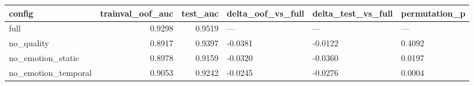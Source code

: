 \begin{tabular}{lrrlll}
\toprule
config & trainval_oof_auc & test_auc & delta_oof_vs_full & delta_test_vs_full & permutation_p \\
\midrule
full & 0.9298 & 0.9519 & --- & --- & --- \\
no_quality & 0.8917 & 0.9397 & -0.0381 & -0.0122 & 0.4092 \\
no_emotion_static & 0.8978 & 0.9159 & -0.0320 & -0.0360 & 0.0197 \\
no_emotion_temporal & 0.9053 & 0.9242 & -0.0245 & -0.0276 & 0.0004 \\
\bottomrule
\end{tabular}

